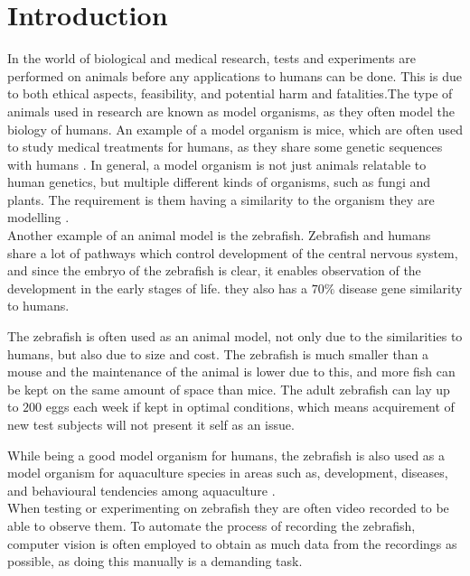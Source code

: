 \graphicspath{{figures/intro/}}
\chapter{Introduction}\label{ch:intro}
In the world of biological and medical research, tests and experiments are performed on animals before any applications to humans can be done. This is due to both ethical aspects, feasibility, and potential harm and fatalities.The type of animals used in research are known as model organisms, as they often model the biology of humans. An example of a model organism is mice, which are often used to study medical treatments for humans, as they share some genetic sequences with humans \citep{Perlman2016, RahmanKhan2018}. 
In general, a model organism is not just animals relatable to human genetics, but multiple different kinds of organisms, such as fungi and plants. The requirement is them having a similarity to the organism they are modelling \citep{Hedges2002}.\\

Another example of an animal model is the zebrafish. Zebrafish and humans share a lot of pathways which control development of the central nervous system, and since the embryo of the zebrafish is clear, it enables observation of the development in the early stages of life. they also has a $70\%$ disease gene similarity to humans. 

The zebrafish is often used as an animal model, not only due to the similarities to humans, but also due to size and cost. The zebrafish is much smaller than a mouse and the maintenance of the animal is lower due to this, and more fish can be kept on the same amount of space than mice.
The adult zebrafish can lay up to $200$ eggs each week if kept in optimal conditions, which means acquirement of new test subjects will not present it self as an issue.

While being a good model organism for humans, the zebrafish is also used as a model organism for aquaculture species in areas such as, development, diseases, and behavioural tendencies among aquaculture \citep{RahmanKhan2018}.\\ 

When testing or experimenting on zebrafish they are often video recorded to be able to observe them. To automate the process of recording the zebrafish, computer vision is often employed to obtain as much data from the recordings as possible, as doing this manually is a demanding task.

